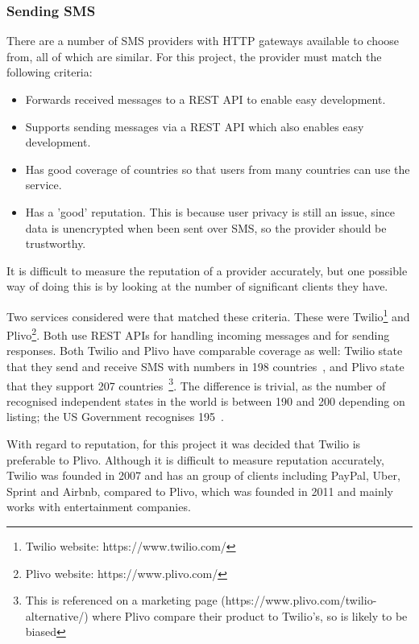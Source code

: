 \documentclass[authoryearcitations]{UoYCSproject}
\begin{document}
\subsubsection{Sending SMS}
There are a number of SMS providers with HTTP gateways available to choose from, all of which are similar. For this project, the provider must match the following criteria:
\begin{itemize}
  \item Forwards received messages to a REST API to enable easy development.
  \item Supports sending messages via a REST API which also enables easy development.
  \item Has good coverage of countries so that users from many countries can use the service.
  \item Has a 'good' reputation. This is because user privacy is still an issue, since data is unencrypted when been sent over SMS, so the provider should be trustworthy.
\end{itemize}

It is difficult to measure the reputation of a provider accurately, but one possible way of doing this is by looking at the number of significant clients they have.

Two services considered were that matched these criteria.  These were Twilio\footnote{Twilio website: https://www.twilio.com/} and Plivo\footnote{Plivo website: https://www.plivo.com/}. Both use REST APIs for handling incoming messages and for sending responses. Both Twilio and Plivo have comparable coverage as well: Twilio state that they send and receive SMS with numbers in 198 countries~\cite{twilioCoverage}, and Plivo state that they support 207 countries~\cite{plivoCoverage}\footnote{This is referenced on a marketing page (https://www.plivo.com/twilio-alternative/) where Plivo compare their product to Twilio's, so is likely to be biased}. The difference is trivial, as the number of recognised independent states in the world is between 190 and 200 depending on listing; the US Government recognises 195~\cite{usStateDepartmentListOfIndependentStates}.

With regard to reputation, for this project it was decided that Twilio is preferable to Plivo. Although it is difficult to measure reputation accurately, Twilio was founded in 2007 and has an group of clients including PayPal, Uber, Sprint and Airbnb, compared to Plivo, which was founded in 2011 and mainly works with entertainment companies.
\end{document}
